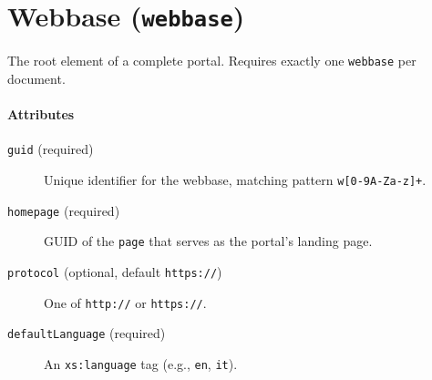 \section{Webbase (\texttt{webbase})}
The root element of a complete portal. Requires exactly one \texttt{webbase} per document.
\paragraph{Attributes}
\begin{description}
  \item[\texttt{guid} (required)] Unique identifier for the webbase, matching pattern \texttt{w[0-9A-Za-z]+}.
  \item[\texttt{homepage} (required)] GUID of the \texttt{page} that serves as the portal's landing page.
  \item[\texttt{protocol} (optional, default \texttt{https://})] One of \texttt{http://} or \texttt{https://}.
  \item[\texttt{defaultLanguage} (required)] An \texttt{xs:language} tag (e.g., \texttt{en}, \texttt{it}).
\end{description}
